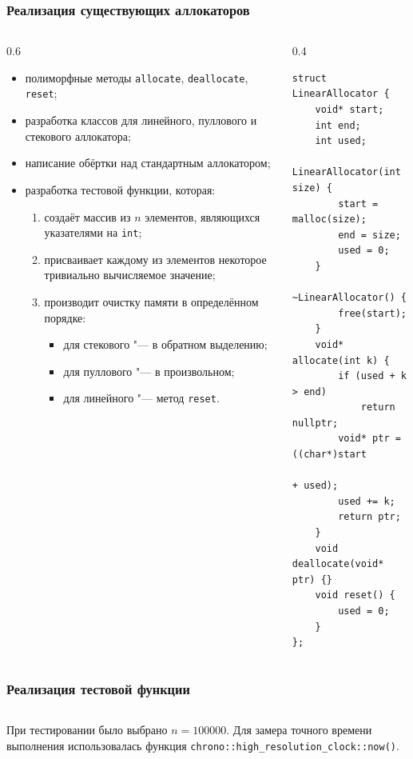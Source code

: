 \documentclass{beamer}
\begin{document}
\begin{frame}
\frametitle{Реализация существующих аллокаторов}
\justifying
\begin{columns}[T]
\begin{column}{0.6\textwidth}
\begin{itemize}
	\item полиморфные методы \texttt{allocate}, \texttt{deallocate}, \texttt{reset};
	\item разработка классов для линейного, пуллового и стекового аллокатора;
	\item написание обёртки над стандартным аллокатором;
	\item разработка тестовой функции, которая:
	\begin{enumerate}
		\item создаёт массив из $n$ элементов, являющихся указателями на \texttt{int};
		\item присваивает каждому из элементов некоторое тривиально вычисляемое значение;
		\item производит очистку памяти в определённом порядке:
		\begin{itemize}
		\item для стекового "--- в обратном выделению;
		\item для пуллового "--- в произвольном;
		\item для линейного "--- метод \texttt{reset}.
		\end{itemize}
	\end{enumerate}
\end{itemize}
\end{column}

\begin{column}{0.4\textwidth}
\scriptsize
\begin{verbatim}
struct LinearAllocator {
	void* start;
	int end;
	int used;
	LinearAllocator(int size) { 
		start = malloc(size);
		end = size;
		used = 0;
	}
	~LinearAllocator() {
		free(start);
	}
	void* allocate(int k) {
    	if (used + k > end) 
			return nullptr;
		void* ptr = ((char*)start
					+ used);
    	used += k;
    	return ptr;
	}
	void deallocate(void* ptr) {}
  	void reset() {
    	used = 0;
  	}
};
\end{verbatim}
\normalsize
\end{column}
\end{columns}
\end{frame}

\begin{frame}[plain]
\frametitle{Реализация тестовой функции}
\justifying
\begin{block}{}
\inputminted{cpp}{test_function.cpp}
\end{block}
При тестировании было выбрано $n = 100000$. Для замера точного времени выполнения использовалась функция \texttt{chrono::high\_resolution\_clock::now()}.
\end{frame}
\end{document}
